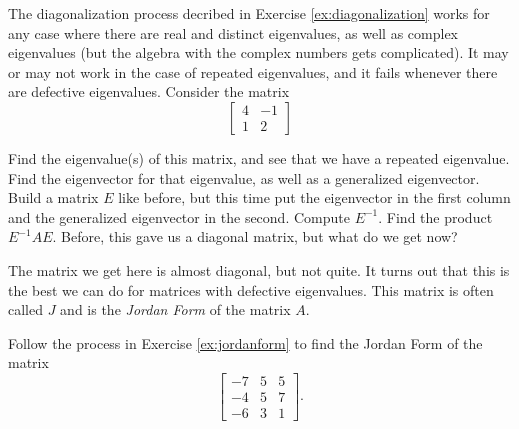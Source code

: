 \documentclass{ximera}
\begin{document}
\begin{exercise} \label{ex:jordanform}
    The diagonalization process decribed in Exercise \ref{ex:diagonalization} works for any case where there are real and distinct eigenvalues, as well as complex eigenvalues (but the algebra with the complex numbers gets complicated). It may or may not work in the case of repeated eigenvalues, and it fails whenever there are defective eigenvalues. Consider the matrix
    \[ \begin{bmatrix} 4 & -1 \\ 1 & 2 \end{bmatrix} \]
    \begin{tasks}
        \task Find the eigenvalue(s) of this matrix, and see that we have a repeated eigenvalue. 
        \task Find the eigenvector for that eigenvalue, as well as a generalized eigenvector.
        \task Build a matrix $E$ like before, but this time put the eigenvector in the first column and the generalized eigenvector in the second. Compute $E^{-1}$. 
        \task Find the product $E^{-1}AE$. Before, this gave us a diagonal matrix, but what do we get now? 
    \end{tasks}
    The matrix we get here is almost diagonal, but not quite. It turns out that this is the best we can do for matrices with defective eigenvalues. This matrix is often called $J$ and is the \emph{Jordan Form} of the matrix $A$. 
\end{exercise}

\begin{exercise}%
    Follow the process in Exercise \ref{ex:jordanform} to find the Jordan Form of the matrix
    \[ \begin{bmatrix} -7 & 5 & 5 \\ -4 & 5 & 7 \\ -6 & 3 & 1 \end{bmatrix}. \]
\end{exercise}
\end{document}
